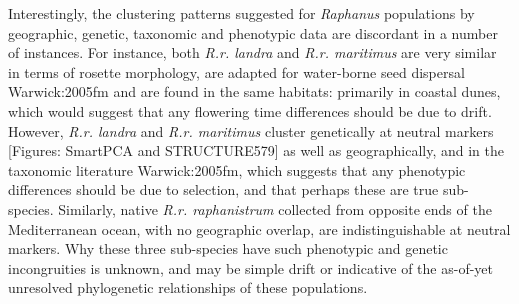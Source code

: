 \documentclass[twocolumn]{bmcart}%
\begin{document}
Interestingly, the clustering patterns suggested for \textit{Raphanus} populations by geographic, genetic, taxonomic and phenotypic data are discordant in a number of instances. For instance, both \textit{R.r. landra} and \textit{R.r. maritimus} are very similar in terms of rosette morphology, are adapted for water-borne seed dispersal {Warwick:2005fm} and are found in the same habitats: primarily in coastal dunes, which would suggest that any flowering time differences should be due to drift. However, \textit{R.r. landra} and \textit{R.r. maritimus} cluster genetically at neutral markers [Figures: SmartPCA and STRUCTURE579] as well as geographically, and in the taxonomic literature {Warwick:2005fm}, which suggests that any phenotypic differences should be due to selection, and that perhaps these are true sub-species. Similarly, native \textit{R.r. raphanistrum} collected from opposite ends of the Mediterranean ocean, with no geographic overlap, are indistinguishable at neutral markers. Why these three sub-species have such phenotypic and genetic incongruities is unknown, and may be simple drift or indicative of the as-of-yet unresolved phylogenetic relationships of these populations. 
%
%
%
%
%
%
\end{document}
